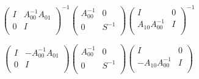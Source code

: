 \[
\left( \begin{array}{cc}
I   & A_{00}^{-1} A_{01} \\
0 & I \\
\end{array} \right)^{-1}
\left( \begin{array}{cc}
A_{00}^{-1}  & 0 \\
0 & S^{-1} \\
\end{array} \right)
\left( \begin{array}{cc}
I   & 0 \\
A_{10}A_{00}^{-1} & I \\
\end{array} \right)^{-1}
\]

\[
\left( \begin{array}{cc}
I   & -A_{00}^{-1} A_{01} \\
0 & I \\
\end{array} \right)
\left( \begin{array}{cc}
A_{00}^{-1}  & 0 \\
0 & S^{-1} \\
\end{array} \right)
\left( \begin{array}{cc}
I   & 0 \\
-A_{10}A_{00}^{-1} & I \\
\end{array} \right)
\]

